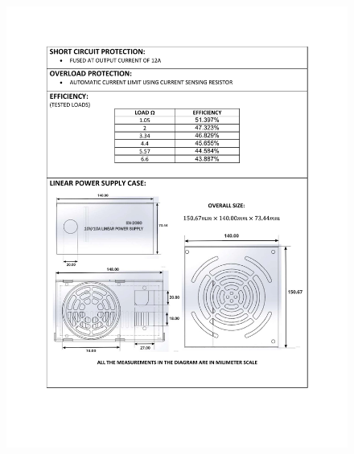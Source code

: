 \documentclass[11pt]{article}
\begin{document}
\begin{figure}
    \centering
    \includegraphics[width=1\textwidth]{DS2.pdf}
\end{figure}
\end{document}
